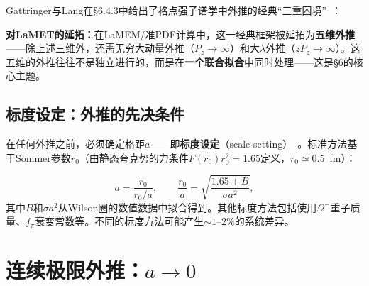 \documentclass[12pt,a4paper]{ctexart}
\theoremstyle{definition}
\begin{document}
Gattringer与Lang在§6.4.3中给出了格点强子谱学中外推的经典``三重困境''~\cite{GattringerLang2010}：

\begin{center}
\end{center}

\textbf{对LaMET的延拓：}在LaMEM/准PDF计算中，这一经典框架被延拓为\textbf{五维外推}——除上述三维外，还需无穷大动量外推（$P_z\to\infty$）和大$\lambda$外推（$zP_z\to\infty$）。这五维的外推往往不是独立进行的，而是在\textbf{一个联合拟合}中同时处理——这是§6的核心主题。

\subsection{标度设定：外推的先决条件}

在任何外推之前，必须确定格距$a$——即\textbf{标度设定}（scale setting）~\cite{GattringerLang2010}。标准方法基于Sommer参数$r_0$（由静态夸克势的力条件$F(r_0) r_0^2 = 1.65$定义，$r_0 \simeq 0.5$~fm）：

\begin{equation}
a = \frac{r_0}{r_0/a}, \qquad \frac{r_0}{a} = \sqrt{\frac{1.65 + B}{\sigma a^2}},
\label{eq:scale_setting}
\end{equation}
其中$B$和$\sigma a^2$从Wilson圈的数值数据中拟合得到。其他标度方法包括使用$\Omega^-$重子质量、$f_\pi$衰变常数等。不同的标度方法可能产生$\sim 1\text{--}2\%$的系统差异。

\section{连续极限外推：$a \to 0$}
\end{document}
